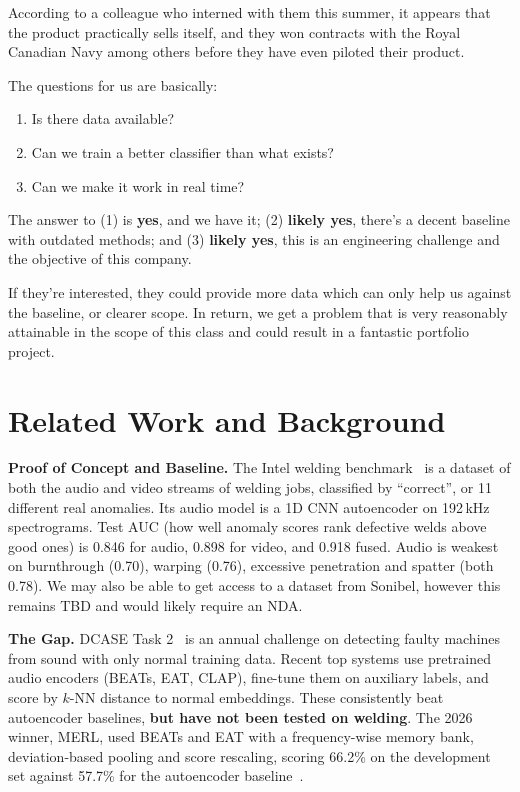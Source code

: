 \documentclass[11pt]{article}
\begin{document}
According to a colleague who interned with them this summer, it appears that the product practically sells itself, and they won contracts with the Royal Canadian Navy among others before they have even piloted their product.

The questions for us are basically:
\begin{enumerate}
    \item Is there data available?
    \item Can we train a better classifier than what exists?
    \item Can we make it work in real time?
\end{enumerate}

The answer to (1) is \textbf{yes}, and we have it; (2) \textbf{likely yes}, there's a decent baseline with outdated methods; and (3) \textbf{likely yes}, this is an engineering challenge and the objective of this company.

If they're interested, they could provide more data which can only help us against the baseline, or clearer scope. In return, we get a problem that is very reasonably attainable in the scope of this class and could result in a fantastic portfolio project.

\section{Related Work and Background}

\textbf{Proof of Concept and Baseline.} The Intel welding benchmark~\cite{stemmer2024} is a dataset of both the audio and video streams of welding jobs, classified by ``correct'', or 11 different real anomalies. Its audio model is a 1D CNN autoencoder on 192\,kHz spectrograms. Test AUC (how well anomaly scores rank defective welds above good ones) is 0.846 for audio, 0.898 for video, and 0.918 fused. Audio is weakest on burnthrough (0.70), warping (0.76), excessive penetration and spatter (both 0.78). We may also be able to get access to a dataset from Sonibel, however this remains TBD and would likely require an NDA.

\textbf{The Gap.} DCASE Task 2~\cite{dcase2026} is an annual challenge on detecting faulty machines from sound with only normal training data. Recent top systems use pretrained audio encoders (BEATs, EAT, CLAP), fine-tune them on auxiliary labels, and score by $k$-NN distance to normal embeddings. These consistently beat autoencoder baselines, \textbf{but have not been tested on welding}. The 2026 winner, MERL, used BEATs and EAT with a frequency-wise memory bank, deviation-based pooling and score rescaling, scoring 66.2\% on the development set against 57.7\% for the autoencoder baseline~\cite{merl2026}.
\end{document}
